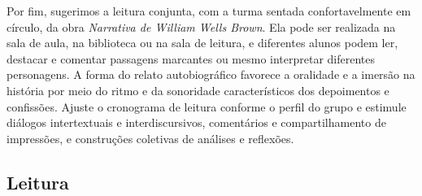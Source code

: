 \documentclass[11pt]{extarticle}
\begin{document}
Por fim, sugerimos a leitura conjunta, com a turma sentada
confortavelmente em círculo, da obra \emph{Narrativa de William Wells
Brown}. Ela pode ser realizada na sala de aula, na biblioteca ou na sala
de leitura, e diferentes alunos podem ler, destacar e comentar passagens
marcantes ou mesmo interpretar diferentes personagens. A forma do relato
autobiográfico favorece a oralidade e a imersão na história por meio do
ritmo e da sonoridade característicos dos depoimentos e confissões.
Ajuste o cronograma de leitura conforme o perfil do grupo e estimule
diálogos intertextuais e interdiscursivos, comentários e
compartilhamento de impressões, e construções coletivas de análises e
reflexões.

\subsection{Leitura}


\end{document}
